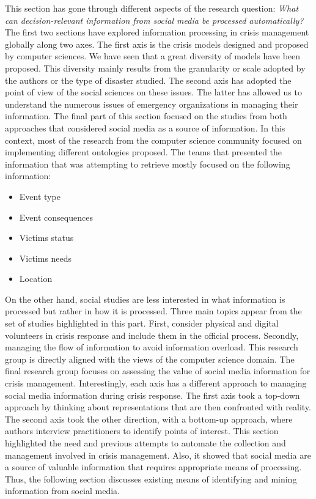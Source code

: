 This section has gone through different aspects of the research question: \emph{What can decision-relevant information from social media be processed automatically?}
The first two sections have explored information processing in crisis management globally along two axes.
The first axis is the crisis models designed and proposed by computer sciences.
We have seen that a great diversity of models have been proposed.
This diversity mainly results from the granularity or scale adopted by the authors or the type of disaster studied.
The second axis has adopted the point of view of the social sciences on these issues.
The latter has allowed us to understand the numerous issues of emergency organizations in managing their information.
The final part of this section focused on the studies from both approaches that considered social media as a source of information.
In this context, most of the research from the computer science community focused on implementing different ontologies proposed.
The teams that presented the information that was attempting to retrieve mostly focused on the following information:

\begin{itemize}
    \item Event type
    \item Event consequences
    \item Victims status
    \item Victims needs
    \item Location
\end{itemize}

On the other hand, social studies are less interested in what information is processed but rather in how it is processed.
Three main topics appear from the set of studies highlighted in this part.
First, consider physical and digital volunteers in crisis response and include them in the official process.
Secondly, managing the flow of information to avoid information overload.
This research group is directly aligned with the views of the computer science domain.
The final research group focuses on assessing the value of social media information for crisis management.
Interestingly, each axis has a different approach to managing social media information during crisis response.
The first axis took a top-down approach by thinking about representations that are then confronted with reality.
The second axis took the other direction, with a bottom-up approach, where authors interview practitioners to identify points of interest.
This section highlighted the need and previous attempts to automate the collection and management involved in crisis management.
Also, it showed that social media are a source of valuable information that requires appropriate means of processing.
Thus, the following section discusses existing means of identifying and mining information from social media.

